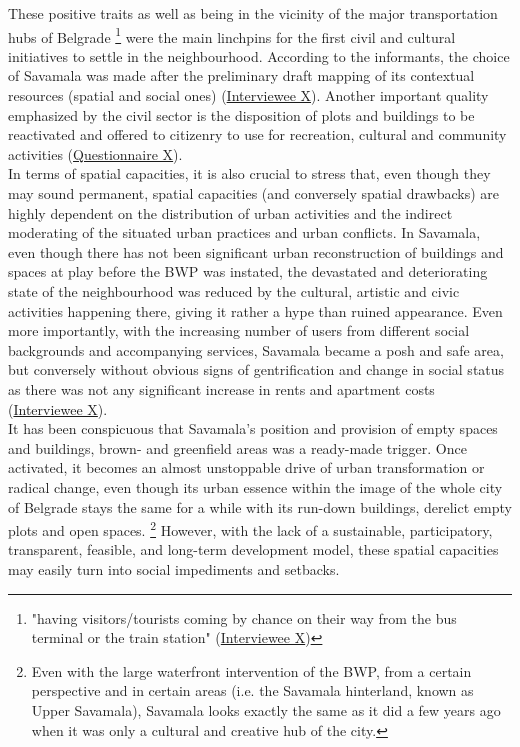 \documentclass[11pt]{report}
\begin{document}
These positive traits as well as being in the vicinity of the major transportation hubs of Belgrade
\footnote{"having visitors/tourists coming by chance on their way from the bus terminal or the train station" (\href{InterviewX}{Interviewee X})}
were the main linchpins for the first civil and cultural initiatives to settle in the neighbourhood. According to the informants, the choice of Savamala was made after the preliminary draft mapping of its contextual resources (spatial and social ones) (\href{InterviewX}{Interviewee X}).
Another important quality emphasized by the civil sector is the disposition of plots and buildings to be reactivated and offered to citizenry to use for recreation, cultural and community activities (\href{Questionnaire Students Savamala}{Questionnaire X}).
\\

In terms of spatial capacities, it is also crucial to stress that, even though they may sound permanent, spatial capacities (and conversely spatial drawbacks) are highly dependent on the distribution of urban activities and the indirect moderating of the situated urban practices and urban conflicts. In Savamala, even though there has not been significant urban reconstruction of buildings and spaces at play before the BWP was instated, the devastated and deteriorating state of the neighbourhood was reduced by the cultural, artistic and civic activities happening there, giving it rather a hype than ruined appearance. Even more importantly, with the increasing number of users from different social backgrounds and accompanying services, Savamala became a posh and safe area, but conversely without obvious signs of gentrification and change in  social status as there was not any significant increase in rents and apartment costs
(\href{InterviewX}{Interviewee X}).
\\

It has been conspicuous that Savamala’s position and provision of empty spaces and buildings, brown- and greenfield areas was a ready-made trigger. Once activated, it becomes an almost unstoppable drive of urban transformation or radical change, even though its urban essence within the image of the whole city of Belgrade stays the same for a while with its run-down buildings, derelict empty plots and open spaces.
\footnote{Even with the large waterfront intervention of the BWP, from a certain perspective and in certain areas (i.e. the Savamala hinterland, known as Upper Savamala), Savamala looks exactly the same as it did a few years ago when it was only a cultural and creative hub of the city.}
However, with the lack of a sustainable, participatory, transparent, feasible, and long-term development model, these spatial capacities may easily turn into social impediments and setbacks.
\end{document}
